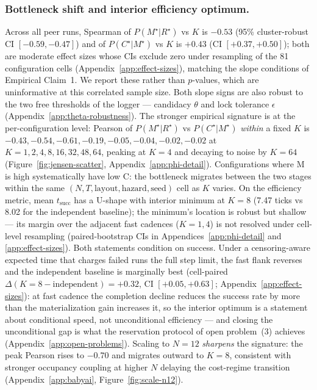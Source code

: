 \documentclass{article}
\begin{document}
\subsubsection{Bottleneck shift and interior efficiency optimum.}
Across all peer runs, Spearman of $P(M^\star|R^\star)$ vs $K$ is $-0.53$ (95\% cluster-robust CI $[-0.59,-0.47]$) and of $P(C^\star|M^\star)$ vs $K$ is $+0.43$ (CI $[+0.37,+0.50]$); both are moderate effect sizes whose CIs exclude zero under resampling of the 81 configuration cells (Appendix~\ref{app:effect-sizes}), matching the slope conditions of Empirical Claim~1. We report these rather than $p$-values, which are uninformative at this correlated sample size. Both slope signs are also robust to the two free thresholds of the logger --- candidacy $\theta$ and lock tolerance $\epsilon$ (Appendix~\ref{app:theta-robustness}). The stronger empirical signature is at the per-configuration level: Pearson of $P(M^\star|R^\star)$ vs $P(C^\star|M^\star)$ \emph{within} a fixed $K$ is $-0.43, -0.54, -0.61, -0.19, -0.05, -0.04, -0.02, -0.02$ at $K{=}1,2,4,8,16,32,48,64$, peaking at $K{=}4$ and decaying to noise by $K{=}64$ (Figure~\ref{fig:jensen-scatter}, Appendix~\ref{app:phi-detail}). Configurations where M is high systematically have low C: the bottleneck migrates between the two stages within the same $(N,T,\text{layout},\text{hazard},\text{seed})$ cell as $K$ varies. On the efficiency metric, mean $t_{\mathrm{succ}}$ has a U-shape with interior minimum at $K{=}8$ (7.47 ticks vs 8.02 for the independent baseline); the minimum's location is robust but shallow --- its margin over the adjacent fast cadences ($K{=}1,4$) is not resolved under cell-level resampling (paired-bootstrap CIs in Appendices~\ref{app:phi-detail} and \ref{app:effect-sizes}). Both statements condition on success. Under a censoring-aware expected time that charges failed runs the full step limit, the fast flank reverses and the independent baseline is marginally best (cell-paired $\Delta(K{=}8-\text{independent}) = +0.32$, CI $[+0.05,+0.63]$; Appendix~\ref{app:effect-sizes}): at fast cadence the completion decline reduces the success rate by more than the materialization gain increases it, so the interior optimum is a statement about conditional speed, not unconditional efficiency --- and closing the unconditional gap is what the reservation protocol of open problem~(3) achieves (Appendix~\ref{app:open-problems}). Scaling to $N{=}12$ \emph{sharpens} the signature: the peak Pearson rises to $-0.70$ and
migrates outward to $K\!=\!8$, consistent with stronger occupancy
coupling at higher $N$ delaying the cost-regime transition
(Appendix~\ref{app:babyai}, Figure~\ref{fig:scale-n12}).
\end{document}
